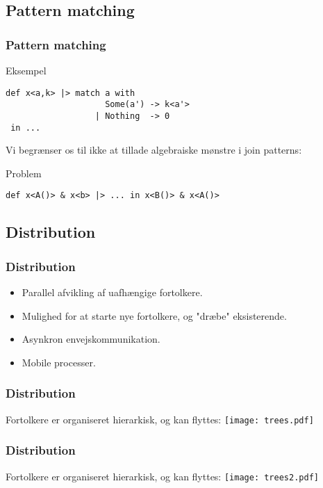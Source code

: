 \documentclass{beamer}
\begin{document}
\subsection{Pattern matching}
\begin{frame}[fragile]
\frametitle{Pattern matching}
\begin{block}{Eksempel}
\begin{lstlisting}
def x<a,k> |> match a with
                    Some(a') -> k<a'>
                  | Nothing  -> 0
 in ...
\end{lstlisting}
\end{block}
Vi begrænser os til ikke at tillade algebraiske mønstre i join patterns:
\begin{block}{Problem}
\begin{lstlisting}
def x<A()> & x<b> |> ... in x<B()> & x<A()>
\end{lstlisting}
\end{block}
\end{frame}


\subsection{Distribution}

\begin{frame}[fragile]
\frametitle{Distribution}
\begin{itemize}
\item
  Parallel afvikling af uafhængige fortolkere.

\item
  Mulighed for at starte nye fortolkere, og "dræbe" eksisterende.

\item
  Asynkron envejskommunikation.

\item
  Mobile processer.
\end{itemize}
\end{frame}

\begin{frame}[fragile]
\frametitle{Distribution}
Fortolkere er organiseret hierarkisk, og kan flyttes:
\texttt{[image: trees.pdf]}
\end{frame}
\begin{frame}[fragile]
\frametitle{Distribution}
Fortolkere er organiseret hierarkisk, og kan flyttes:
\texttt{[image: trees2.pdf]}
\end{frame}
\end{document}
